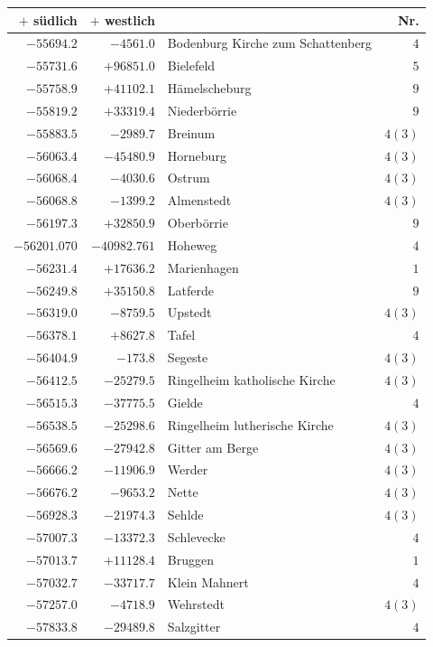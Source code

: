 \clearpage{}%
\begin{center}\begingroup\fontsize{8}{9}\selectfont
\setlength{\tabcolsep}{4pt}
\begin{tabular}{r|r|p{170pt}|r}\hline
\(+\) südlich&\(+\) westlich&&Nr.\\\hline
\(-55694.2\)&\(-4561.0\)&Bodenburg Kirche zum Schattenberg&\(4\)\\
\(-55731.6\)&\(+96851.0\)&Bielefeld&\(5\)\\
\(-55758.9\)&\(+41102.1\)&Hämelscheburg&\(9\)\\
\(-55819.2\)&\(+33319.4\)&Niederbörrie&\(9\)\\
\(-55883.5\)&\(-2989.7\)&Breinum&\(4 (3)\)\\
\(-56063.4\)&\(-45480.9\)&Horneburg&\(4 (3)\)\\
\(-56068.4\)&\(-4030.6\)&Ostrum&\(4 (3)\)\\
\(-56068.8\)&\(-1399.2\)&Almenstedt&\(4 (3)\)\\
\(-56197.3\)&\(+32850.9\)&Oberbörrie&\(9\)\\
\(-56201.070\)&\(-40982.761\)&Hoheweg&\(4\)\\
\(-56231.4\)&\(+17636.2\)&Marienhagen&\(1\)\\
\(-56249.8\)&\(+35150.8\)&Latferde&\(9\)\\
\(-56319.0\)&\(-8759.5\)&Upstedt&\(4 (3)\)\\
\(-56378.1\)&\(+8627.8\)&Tafel&\(4\)\\
\(-56404.9\)&\(-173.8\)&Segeste&\(4 (3)\)\\
\(-56412.5\)&\(-25279.5\)&Ringelheim katholische Kirche&\(4 (3)\)\\
\(-56515.3\)&\(-37775.5\)&Gielde&\(4\)\\
\(-56538.5\)&\(-25298.6\)&Ringelheim lutherische Kirche&\(4 (3)\)\\
\(-56569.6\)&\(-27942.8\)&Gitter am Berge&\(4 (3)\)\\
\(-56666.2\)&\(-11906.9\)&Werder&\(4 (3)\)\\
\(-56676.2\)&\(-9653.2\)&Nette&\(4 (3)\)\\
\(-56928.3\)&\(-21974.3\)&Sehlde&\(4 (3)\)\\
\(-57007.3\)&\(-13372.3\)&Schlevecke&\(4\)\\
\(-57013.7\)&\(+11128.4\)&Bruggen&\(1\)\\
\(-57032.7\)&\(-33717.7\)&Klein Mahnert&\(4\)\\
\(-57257.0\)&\(-4718.9\)&Wehrstedt&\(4 (3)\)\\
\(-57833.8\)&\(-29489.8\)&Salzgitter&\(4\)\\

\end{tabular}
\end{center}
